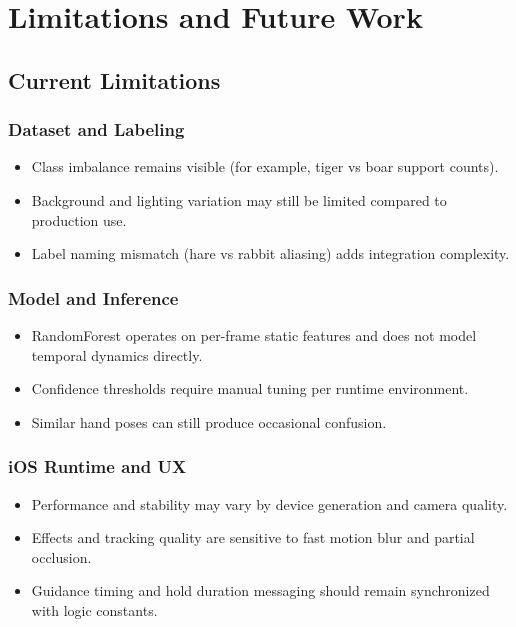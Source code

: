 \chapter{Limitations and Future Work}

\section{Current Limitations}
\subsection{Dataset and Labeling}
\begin{itemize}[leftmargin=2em]
\item Class imbalance remains visible (for example, tiger vs boar support counts).
\item Background and lighting variation may still be limited compared to production use.
\item Label naming mismatch (hare vs rabbit aliasing) adds integration complexity.
\end{itemize}

\subsection{Model and Inference}
\begin{itemize}[leftmargin=2em]
\item RandomForest operates on per-frame static features and does not model temporal dynamics directly.
\item Confidence thresholds require manual tuning per runtime environment.
\item Similar hand poses can still produce occasional confusion.
\end{itemize}

\subsection{iOS Runtime and UX}
\begin{itemize}[leftmargin=2em]
\item Performance and stability may vary by device generation and camera quality.
\item Effects and tracking quality are sensitive to fast motion blur and partial occlusion.
\item Guidance timing and hold duration messaging should remain synchronized with logic constants.
\end{itemize}

